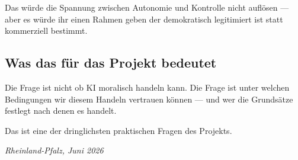 \documentclass[acmcp, noacm]{acmart}
\begin{document}
Das würde die Spannung zwischen Autonomie und Kontrolle nicht auflösen --- aber es würde ihr einen Rahmen geben der demokratisch legitimiert ist statt kommerziell bestimmt.

\subsection{Was das für das Projekt bedeutet}

Die Frage ist nicht ob KI moralisch handeln kann. Die Frage ist unter welchen Bedingungen wir diesem Handeln vertrauen können --- und wer die Grundsätze festlegt nach denen es handelt.

Das ist eine der dringlichsten praktischen Fragen des Projekts.

\medskip

\medskip

\textit{Rheinland-Pfalz, Juni 2026}



\end{document}
